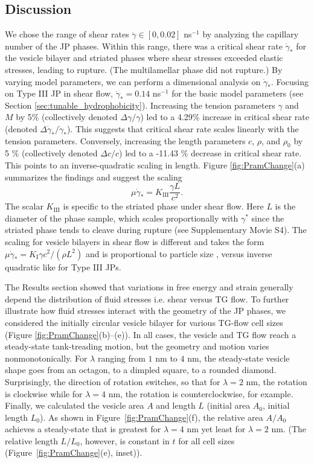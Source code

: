 \documentclass[prb,preprint,showpacs,preprintnumbers,amsmath,amssymb,longbibliography]{revtex4-1}
\begin{document}
\subsection{Discussion}
We chose the range of shear rates $\dot \gamma \in [0, 0.02]$ ns$^{-1}$
by analyzing the capillary number of the JP phases.  Within this range, 
there was a critical shear rate $\dot \gamma_*$ for the vesicle bilayer
and striated phases where shear stresses exceeded elastic stresses,
leading to rupture.  (The multilamellar phase did not rupture.)
By varying model parameters, we can perform a dimensional analysis 
on $\dot \gamma_*$.  Focusing on Type III JP in shear flow, 
$\dot \gamma_* = 0.14$ ns$^{-1}$ for the basic model parameters
(see Section \ref{sec:tunable_hydrophobicity}).  Increasing 
the tension parameters $\gamma$ and $M$ by 5\% (collectively denoted
$\Delta \gamma/\gamma$) led to a 4.29\% increase in critical shear
rate (denoted $\Delta \dot \gamma_*/\dot \gamma_*$).  This suggests
that critical shear rate scales linearly with the tension parameters.
Conversely, increasing the length parameters $c$, $\rho$, and $\rho_0$
by 5 \% (collectively denoted $\Delta c/c$) led to a -11.43 \% 
decrease in critical shear rate.  This points to an inverse-quadratic
scaling in length. Figure \ref{fig:PramChange}(a) summarizes the 
findings and suggest the scaling
\begin{equation}
\label{eq:CSR}
\mu \dot\gamma_* = K_{\text{III}} \frac{\gamma L}{c^2}.
\end{equation}
The scalar $K_{\text{III}}$ is specific to the striated phase under shear flow.
Here $L$ is the diameter of the phase sample, which scales proportionally 
with $\gamma^*$ since the striated phase tends to cleave during
rupture (see Supplementary Movie S4).
The scaling for vesicle bilayers in shear flow is different
and takes the form $\mu \dot\gamma_* = K_{\text{I}} \gamma c^2/(\rho L^2)$
and is proportional to particle size \cite{Fu2022_JFM}, versus inverse quadratic
like for Type III JPs. 

The Results section showed that 
variations in free energy and strain 
generally depend the distribution
of fluid stresses i.e. shear versus TG flow.   
To further illustrate how fluid stresses interact with the geometry of the JP
phases, we considered the initially circular vesicle bilayer
for various TG-flow cell sizes (Figure \ref{fig:PramChange}(b)--(e)). 
In all cases, the vesicle and TG flow reach a steady-state tank-treading motion,
but the geometry and motion varies nonmonotonically. 
For $\lambda$ ranging from $1$ nm to $4$ nm,
the steady-state vesicle shape goes from an octagon, to a dimpled square,
to a rounded diamond. Surprisingly, the direction of rotation switches,
so that for $\lambda = 2$ nm, the rotation is clockwise while
for $\lambda = 4$ nm, the rotation is counterclockwise, for example. 
Finally, we calculated the vesicle area $A$ and length $L$ (initial area $A_0$,
initial length $L_0$). 
As shown in Figure~\ref{fig:PramChange}(f), the relative
area $A/A_0$ achieves a steady-state that is greatest for $\lambda = 4$ nm
yet least for $\lambda = 2$ nm. 
(The relative length $L/L_0$, however, is
constant in $t$ for all cell sizes (Figure~\ref{fig:PramChange}(e),
inset)).
  
\end{document}
